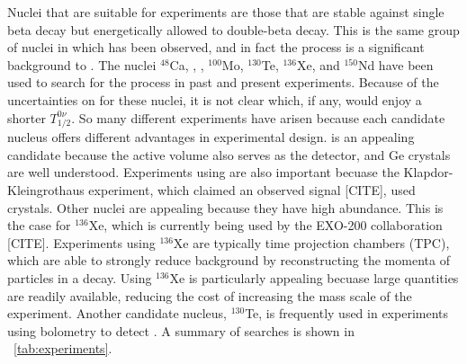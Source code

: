 Nuclei that are suitable for \zvbb experiments are those that are stable against single beta decay but energetically allowed to double-beta decay.  This is the same group of nuclei in which \tvbb has been observed, and in fact the \tvbb process is a significant background to \zvbb.  The nuclei $^{48}$Ca, , , $^{100}$Mo, $^{130}$Te, $^{136}$Xe, and $^{150}$Nd have been used to search for the process in past and present experiments.  Because of the uncertainties on \NME for these nuclei, it is not clear which, if any, would enjoy a shorter $T^{0\nu}_{1/2}$.  So many different experiments have arisen because each candidate nucleus offers different advantages in experimental design.   is an appealing candidate because the active volume also serves as the detector, and Ge crystals are well understood.  Experiments using  are also important becuase the Klapdor-Kleingrothaus experiment, which claimed an observed \zvbb signal [CITE], used  crystals.  Other nuclei are appealing because they have high abundance.  This is the case for $^{136}$Xe, which is currently being used by the EXO-200 collaboration [CITE].  Experiments using $^{136}$Xe are typically time projection chambers (TPC), which are able to strongly reduce background by reconstructing the momenta of particles in a decay.  Using $^{136}$Xe is particularly appealing becuase large quantities are readily available, reducing the cost of increasing the mass scale of the experiment.  Another candidate nucleus, $^{130}$Te, is frequently used in experiments using bolometry to detect \zvbb.  A summary of \zvbb searches is shown in {\tab}~\ref{tab:experiments}.
